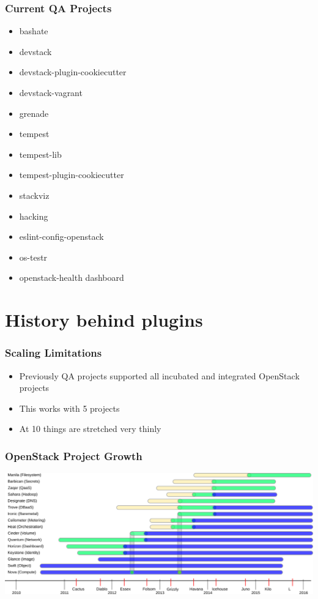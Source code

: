 \documentclass[aspectratio=169,11pt,hyperref={colorlinks=true}]{beamer}
\begin{document}
\begin{frame}
    \frametitle{Current QA Projects}
    \begin{itemize}
    \item{bashate}
    \item{devstack}
    \item{devstack-plugin-cookiecutter}
    \item{devstack-vagrant}
    \item{grenade}
    \item{tempest}
    \item{tempest-lib}
    \item{tempest-plugin-cookiecutter}
    \item{stackviz}
    \item{hacking}
    \item{eslint-config-openstack}
    \item{os-testr}
    \item{openstack-health dashboard}
    \end{itemize}
\end{frame}

\section{History behind plugins}
\begin{frame}
    \frametitle{Scaling Limitations}
    \begin{itemize}
        \item Previously QA projects supported all incubated and integrated OpenStack projects
        \item This works with 5 projects
        \item At 10 things are stretched very thinly
    \end{itemize}
\end{frame}

\begin{frame}
    \frametitle{OpenStack Project Growth}
    \begin{center}
        \includegraphics[width=\textwidth]{OpenStack_Components.png}
    \end{center}
\end{frame}
\end{document}
